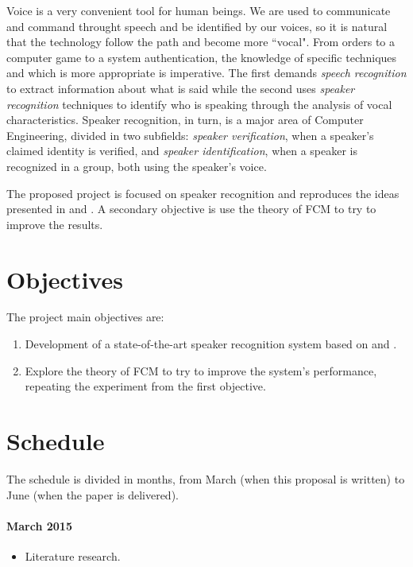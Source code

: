 \documentclass[a4paper,twocolumn]{article}
\begin{document}
Voice is a very convenient tool for human beings. We are used to communicate and command throught speech and be identified by our voices, so it is natural that the technology follow the path and become more ``vocal". From orders to a computer game to a system authentication, the knowledge of specific techniques and which is more appropriate is imperative. The first demands \textit{speech recognition} to extract information about what is said while the second uses \textit{speaker recognition} techniques to identify who is speaking through the analysis of vocal characteristics. Speaker recognition, in turn, is a major area of Computer Engineering, divided in two subfields: \textit{speaker verification}, when a speaker's claimed identity is verified, and \textit{speaker identification}, when a speaker is recognized in a group, both using the speaker's voice.

The proposed project is focused on speaker recognition and reproduces the ideas presented in \cite{reynolds.1992} and \cite{reynolds.quatieri.dunn.2000}. A secondary objective is use the theory of FCM \cite{gao.zhou.pu.2013} to try to improve the results.


\section{Objectives}
\label{ch:objectives}

The project main objectives are:

\begin{enumerate}[noitemsep]
    \item Development of a state-of-the-art speaker recognition system based on \cite{reynolds.1992} and \cite{reynolds.quatieri.dunn.2000}.
    \item Explore the theory of FCM to try to improve the system's performance, repeating the experiment from the first objective.
\end{enumerate}


\section{Schedule}
\label{ch:schedule}

The schedule is divided in months, from March (when this proposal is written) to June (when the paper is delivered).

\paragraph{\textbf{March 2015}}
\begin{itemize}[noitemsep]
    \item Literature research.
\end{itemize}
\end{document}
